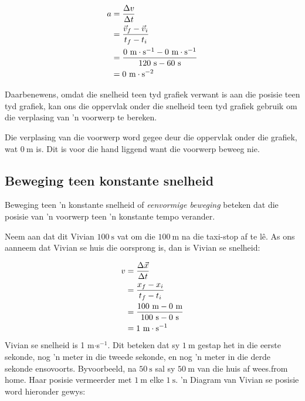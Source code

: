     \begin{align*}
    a &= \frac{\Delta v}{\Delta t}\hfill \\ 
    &= \frac{\vec{v}_{f}-\vec{v}_{i}}{{t}_{f}-{t}_{i}}\hfill \\ 
    &= \frac{0~\text{m}\cdot\text{s}^{-1}-0~\text{m}\cdot\text{s}^{-1}}{120~\text{s}-60~\text{s}}\\ 
    &= 0~\text{m}\cdot\text{s}^{-2}
      \end{align*}

Daarbenewens, omdat die snelheid teen tyd grafiek verwant is aan die posisie teen tyd grafiek, kan ons die oppervlak onder die snelheid teen tyd grafiek gebruik om die verplasing van 'n voorwerp te bereken.\par 

	\par

Die verplasing van die voorwerp word gegee deur die oppervlak onder die grafiek, wat $0~\text{m}$ is. Dit is voor die hand liggend want die voorwerp beweeg nie.\par 


\subsection*{Beweging teen konstante snelheid}
\nopagebreak
Beweging teen 'n konstante snelheid of \textsl{eenvormige beweging} beteken dat die posisie van 'n voorwerp teen 'n konstante tempo verander.\par 
Neem aan dat dit Vivian $100~\text{s}$ vat om die $100~\text{m}$ na die taxi-stop af te l\^e. As ons aanneem dat Vivian se huis die oorsprong is, dan is Vivian se snelheid:\par 
        \label{m38795*id69850}\nopagebreak\noindent{}
          
    \begin{align*}
    	v&= \frac{\Delta \vec{x}}{\Delta t}\hfill \\ 
	&= \frac{{x}_{f}-{x}_{i}}{{t}_{f}-{t}_{i}}\hfill \\ 
	&= \frac{100~\text{m}-0~\text{m}}{100~\text{s}-0~\text{s}}\\ 
	 &= 1~\text{m}\cdot{\text{s}}^{-1}
      \end{align*}
Vivian se snelheid is 1 m$\ensuremath{\cdot}$s${}^{-1}$. Dit beteken dat sy $1~\text{m}$ gestap het in die eerste sekonde, nog 'n meter in die tweede sekonde, en nog 'n meter in die derde sekonde ensovoorts. Byvoorbeeld, na $50~\text{s}$ sal sy $50~\text{m}$ van die huis af wees.from home. Haar posisie vermeerder met $1~\text{m}$ elke $1~\text{s}$. 'n Diagram van Vivian se posisie word hieronder gewys:\par 

